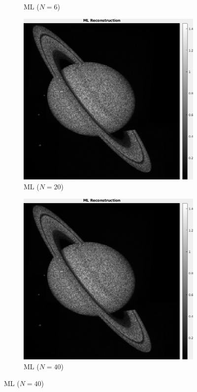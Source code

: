\documentclass[a4paper, 11pt]{article}
\begin{document}
\begin{figure}[h]
\begin{subfigure}[b]{0.22\textwidth}
        \caption{ML ($N=6$)}
        \label{fig:MLN3}
    \end{subfigure}
    \begin{subfigure}[b]{0.22\textwidth}
        \includegraphics[width=\textwidth]{../Figures/MLReconstructionNoiseSigma1e-3Realization20.png}
        \caption{ML ($N=20$)}
        \label{fig:MLN20}
    \end{subfigure}
    \begin{subfigure}[b]{0.22\textwidth}
        \includegraphics[width=\textwidth]{../Figures/MLReconstructionNoiseSigma1e-3Realization20.png}
        \caption{ML ($N=40$)}
        \label{fig:MLN40}
    \end{subfigure}


\end{figure}
\end{document}
